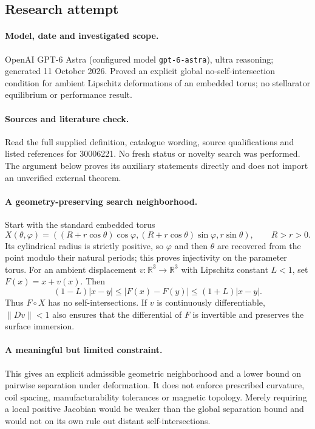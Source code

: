 \documentclass[11pt]{article}
\begin{document}
\subsection{Research attempt}
\paragraph{Model, date and investigated scope.}
OpenAI GPT-6 Astra (configured model \texttt{gpt-6-astra}), ultra reasoning; generated 11 October 2026. Proved an explicit global no-self-intersection condition for ambient Lipschitz deformations of an embedded torus; no stellarator equilibrium or performance result.

\paragraph{Sources and literature check.}
Read the full supplied definition, catalogue wording, source qualifications and listed references for 30006221. No fresh status or novelty search was performed. The argument below proves its auxiliary statements directly and does not import an unverified external theorem.

\paragraph{A geometry-preserving search neighborhood.} Start with the standard embedded torus
\[
 X(\theta,\varphi)=((R+r\cos\theta)\cos\varphi,
 (R+r\cos\theta)\sin\varphi,r\sin\theta),\qquad R>r>0.
\]
Its cylindrical radius is strictly positive, so \(\varphi\) and then \(\theta\) are recovered from the point modulo their natural periods; this proves injectivity on the parameter torus. For an ambient displacement \(v:\mathbb R^3\to\mathbb R^3\) with Lipschitz constant \(L<1\), set \(F(x)=x+v(x)\). Then
\[
 (1-L)|x-y|\leq|F(x)-F(y)|\leq(1+L)|x-y|.
\]
Thus \(F\circ X\) has no self-intersections. If \(v\) is continuously differentiable, \(\|Dv\|<1\) also ensures that the differential of \(F\) is invertible and preserves the surface immersion.
\paragraph{A meaningful but limited constraint.} This gives an explicit admissible geometric neighborhood and a lower bound on pairwise separation under deformation. It does not enforce prescribed curvature, coil spacing, manufacturability tolerances or magnetic topology. Merely requiring a local positive Jacobian would be weaker than the global separation bound and would not on its own rule out distant self-intersections.
\end{document}
